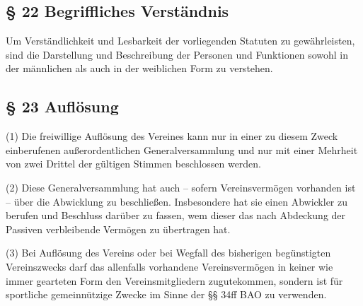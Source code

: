 \documentclass[10pt,a4paper]{article}
\begin{document}
\subsection{§ 22
Begriffliches Verständnis}

Um Verständlichkeit und Lesbarkeit der vorliegenden Statuten zu gewährleisten, sind die Darstellung und Beschreibung der Personen und Funktionen sowohl in der männlichen als auch in der weiblichen Form zu verstehen.

\subsection{§ 23
Auflösung}

(1)
Die freiwillige Auflösung des Vereines kann nur in einer zu diesem Zweck einberufenen außerordentlichen Generalversammlung und nur mit einer Mehrheit von zwei Drittel der gültigen Stimmen beschlossen werden.

(2)
Diese Generalversammlung hat auch – sofern Vereinsvermögen vorhanden ist – über die Abwicklung zu beschließen.
Insbesondere hat sie einen Abwickler zu berufen und Beschluss darüber zu fassen, wem dieser das nach Abdeckung der Passiven verbleibende Vermögen zu übertragen hat.

(3)
Bei Auflösung des Vereins oder bei Wegfall des bisherigen begünstigten Vereinszwecks darf das allenfalls vorhandene Vereinsvermögen in keiner wie immer gearteten Form den Vereinsmitgliedern zugutekommen, sondern ist für sportliche gemeinnützige Zwecke im Sinne der §§ 34ff BAO zu verwenden.
\end{document}

